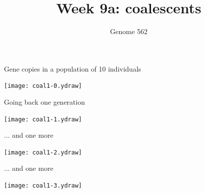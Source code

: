 \documentclass[bluish,slideColor,colorBG,pdf]{prosper}
\title{Week 9a: coalescents}
\author{Genome 562}
\begin{document}
\maketitle

% 
% 
% 
% 

\begin{slide}[Replace]{Gene copies in a population of 10 individuals }

\vspace{-0.2in}

\centerline{\texttt{[image: coal1-0.ydraw]}}

\end{slide}

\begin{slide}[Replace]{Going back one generation}

\vspace{-0.2in}

\centerline{\texttt{[image: coal1-1.ydraw]}}

\end{slide}

\begin{slide}[Replace]{ ... and one more}

\vspace{-0.2in}

\centerline{\texttt{[image: coal1-2.ydraw]}}

\end{slide}

\begin{slide}[Replace]{ ... and one more}

\vspace{-0.2in}

\centerline{\texttt{[image: coal1-3.ydraw]}}

\end{slide}
\end{document}
